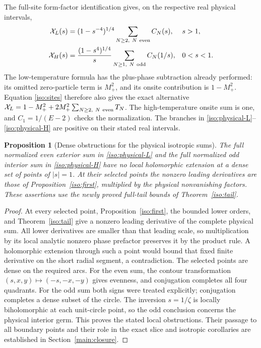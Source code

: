 \documentclass[11pt]{article}
\numberwithin{equation}{section}
\newtheorem{proposition}[theorem]{Proposition}
\theoremstyle{definition}
\begin{document}
The full-site form-factor identification gives, on the respective real
physical intervals,
\begin{align}
 \mathcal X_L(s)&=(1-s^{-4})^{1/4}
                  \sum_{N\ge2,\ N\ {\rm even}}C_N(s),
                  &&s>1,\label{iso:physical-L}\\
 \mathcal X_H(s)&=\frac{(1-s^4)^{1/4}}s
                  \sum_{N\ge1,\ N\ {\rm odd}}C_N(1/s),
                  &&0<s<1.\label{iso:physical-H}
\end{align}
The low-temperature formula has the plus-phase subtraction already
performed: its omitted zero-particle term is $M_+^2$, and its onsite
contribution is $1-M_+^2$. Equation \eqref{iso:sites} therefore also
gives the exact alternative
$\mathcal X_L=1-M_+^2+2M_+^2\sum_{N\ge2,\ N\ {\rm even}}T_N$.
The high-temperature onsite sum is one, and $C_1=1/(E-2)$ checks the
normalization. The branches in \eqref{iso:physical-L}--\eqref{iso:physical-H}
are positive on their stated real intervals.

\begin{proposition}[Dense obstructions for the physical isotropic sums]
\label{iso:local-obstruction}
The full normalized even exterior sum in \eqref{iso:physical-L}
and the full normalized odd interior sum in \eqref{iso:physical-H}
have no local holomorphic extension at a dense set of points of
\(|s|=1\). At their selected points the nonzero leading derivatives
are those of Proposition~\ref{iso:first}, multiplied by the physical
nonvanishing factors. These assertions use the newly proved full-tail
bounds of Theorem~\ref{iso:tail}.
\end{proposition}
\begin{proof}
At every selected point, Proposition~\ref{iso:first}, the bounded lower
orders, and Theorem~\ref{iso:tail} give a nonzero leading derivative of
the complete physical sum. All lower derivatives are smaller than that
leading scale, so multiplication by its local analytic nonzero phase
prefactor preserves it by the product rule. A holomorphic extension
through such a point would bound that fixed finite derivative on the
short radial segment, a contradiction. The selected points are dense on
the required arcs. For the even sum, the contour transformation
$(s,x,y)\mapsto(-s,-x,-y)$ gives evenness, and conjugation completes
all four quadrants. For the odd sum both signs were treated explicitly;
conjugation completes a dense subset of the circle. The inversion
\(s=1/\zeta\) is locally biholomorphic at each unit-circle point,
so the odd conclusion concerns the physical interior germ. This proves
the stated local obstructions. Their passage to all boundary points and
their role in the exact slice and isotropic corollaries are established
in Section~\ref{main:closure}.
\end{proof}
\end{document}
